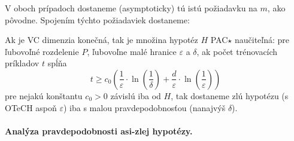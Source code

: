 V oboch prípadoch dostaneme (asymptoticky) tú istú požiadavku na $m$,
ako pôvodne. Spojením týchto požiadaviek dostaneme:

\begin{theorem}
  Ak je VC dimenzia konečná, tak je množina hypotéz $H$ PAC$\star$
  naučiteľná: pre ľubovoľné rozdelenie $P$, ľubovoľne malé hranice
  $\varepsilon$ a $\delta$, ak počet trénovacích príkladov $t$ spĺňa
  $$ t \geq c_0 \left( \frac{1}{\varepsilon} \cdot \ln \left( \frac{1}{\delta} \right) + \frac{d}{\varepsilon} \cdot \ln \left( \frac{1}{\varepsilon} \right) \right) $$
  pre nejakú konštantu $c_0 > 0$ závislú iba od $H$, tak dostaneme
  zlú hypotézu (s OTeCH aspoň $\varepsilon$) iba s malou
  pravdepodobnosťou (nanajvýš $\delta$).
\end{theorem}


\paragraph{Analýza pravdepodobnosti asi-zlej hypotézy.} \label{vc-dokaz:analyza-asi-zla-h}

